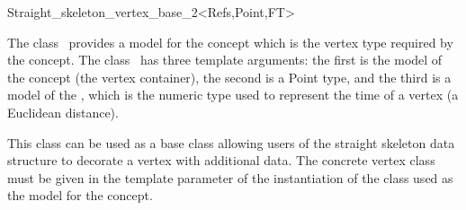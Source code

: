 

\begin{ccRefClass}{Straight_skeleton_vertex_base_2<Refs,Point,FT>}


\ccDefinition

The class \ccRefName\ provides a model for the
 concept which is the vertex
type required by the 
concept. The class \ccRefName\ has three template arguments: the first is 
the model of the  concept (the vertex container), the second is a Point type, and the third is a model of the , which is the numeric type used to represent the time of a vertex (a Euclidean distance).

This class can be used as a base class allowing users of the straight skeleton data structure to decorate a vertex with additional data. The concrete vertex class must be given in the  template parameter of the instantiation of the  class used as the model for the  concept.


\ccIsModel
{}\\
\\
\\
\\

\ccSeeAlso
{}\\
\\
\\
\\
\end{ccRefClass}


